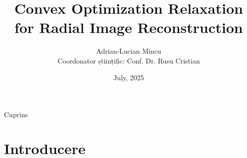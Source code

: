 \documentclass[aspectratio=169,xcolor=dvipsnames]{beamer}
\title{Convex Optimization Relaxation for Radial Image Reconstruction}
\author{
    Adrian-Lucian Mincu\\
    \small Coordonator științific: Conf. Dr. Rusu Cristian
}
\institute
{
    Universitatea din București - Facultatea de Matematică și Informatică
}
\date{July, 2025} %
\begin{document}
\begin{frame}
    \titlepage
\end{frame}

\begin{frame}{Cuprins}
    \tableofcontents
\end{frame}

\section{Introducere}
\end{document}
